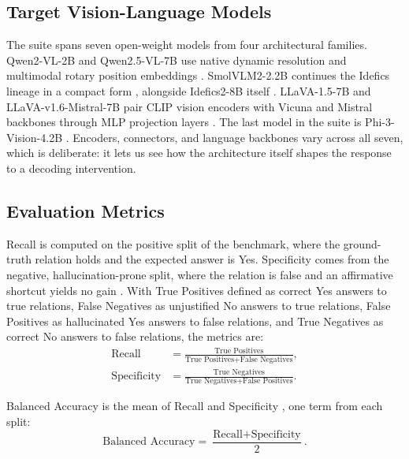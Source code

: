 \documentclass[pdflatex,sn-basic,Numbered]{sn-jnl}
\theoremstyle{thmstyleone}
\theoremstyle{thmstyletwo}
\theoremstyle{thmstylethree}
\begin{document}
\subsection{Target Vision-Language Models}\label{subsec:models}

The suite spans seven open-weight models from four architectural families. Qwen2-VL-2B and Qwen2.5-VL-7B use native dynamic resolution and multimodal rotary position embeddings \cite{bai2025qwen25vl}. SmolVLM2-2.2B continues the Idefics lineage in a compact form \cite{marafioti2025smolvlm,laurencon2024matters}, alongside Idefics2-8B itself \cite{laurencon2024matters}. LLaVA-1.5-7B and LLaVA-v1.6-Mistral-7B pair CLIP vision encoders with Vicuna and Mistral backbones through MLP projection layers \cite{liu2023visual,liu2024improved}. The last model in the suite is Phi-3-Vision-4.2B \cite{abdin2024phi3}. Encoders, connectors, and language backbones vary across all seven, which is deliberate: it lets us see how the architecture itself shapes the response to a decoding intervention.

\subsection{Evaluation Metrics}\label{subsec:metrics}

Recall is computed on the positive split of the benchmark, where the ground-truth relation holds and the expected answer is Yes. Specificity comes from the negative, hallucination-prone split, where the relation is false and an affirmative shortcut yields no gain \cite{yin2025mirage}. With True Positives defined as correct Yes answers to true relations, False Negatives as unjustified No answers to true relations, False Positives as hallucinated Yes answers to false relations, and True Negatives as correct No answers to false relations, the metrics are:
\begin{align}
\text{Recall} &= \frac{\text{True Positives}}{\text{True Positives} + \text{False Negatives}}, \label{eq:recall}\\
\text{Specificity} &= \frac{\text{True Negatives}}{\text{True Negatives} + \text{False Positives}}. \label{eq:spec}
\end{align}

Balanced Accuracy is the mean of Recall and Specificity \cite{brodersen2010balanced}, one term from each split:
\begin{equation}\label{eq:balacc}
\text{Balanced Accuracy} = \frac{\text{Recall} + \text{Specificity}}{2}.
\end{equation}
\end{document}
